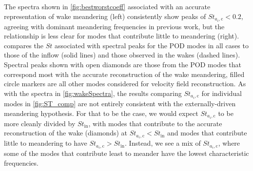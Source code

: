 \documentclass[aip,amsmath,amssymb,preprint,]{revtex4-1}
\begin{document}

The spectra shown in \cref{fig:bestworstcoeff} associated with an accurate representation of wake meandering (left) consistently show peaks of $St_{a_i, \text{c}} < 0.2$, agreeing with dominant meandering frequencies in previous work,
\cite{medici2008measurements,okulov2007stability, okulov2014regular,howard2015statistics,foti2016wake,foti2018wake,baker1985wake,zambrano1983wake,larsen2007dynamic,larsen2008wake,jonkman2017development}
but the relationship is less clear for modes that contribute little to meandering (right).
 compares the $St$ associated with spectral peaks for the POD modes in all cases to those of the inflow (solid lines) and those observed in the wakes (dashed lines).
Spectral peaks shown with open diamonds are those from the POD modes that correspond most with the accurate reconstruction of the wake meandering, filled circle markers are all other modes considered for velocity field reconstruction.
As with the spectra in \cref{fig:wakeSpectra}, the results comparing $St_{a_i,\text{c}}$ for individual modes in \cref{fig:ST_comp} are not entirely consistent with the externally-driven meandering hypothesis. 
For that to be the case, we would expect $St_{a_i,\text{c}}$ to be more cleanly divided by $St_\text{in}$, with modes that contribute to the accurate reconstruction of the wake (diamonds) at $St_{a_i,\text{c}} < St_\text{in}$ and modes that contribute little to meandering to have $St_{a_i,\text{c}} > St_\text{in}$.
Instead, we see a mix of $St_{a_i,\text{c}}$, where some of the modes that contribute least to meander have the lowest characteristic frequencies.
\end{document}
